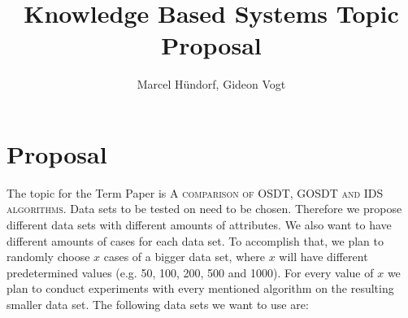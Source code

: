 \documentclass[preprint,a4paper]{sig-alternate-xt}
\begin{document}
\title{Knowledge Based Systems Topic Proposal}


%
\author{
%
\alignauthor Marcel Hündorf, Gideon Vogt\\
}



\maketitle


\section{Proposal}
The topic for the Term Paper is \textsc{A comparison of OSDT, GOSDT and IDS algorithms}.
Data sets to be tested on need to be chosen. Therefore we propose different data sets with different amounts of attributes. We also want to have different amounts of cases for each data set. To accomplish that, we plan to randomly choose $x$ cases of a bigger data set, where $x$ will have different predetermined values (e.g. 50, 100, 200, 500 and 1000). For every value of $x$ we plan to conduct experiments with every mentioned algorithm on the resulting smaller data set. The following data sets we want to use are:
\end{document}
